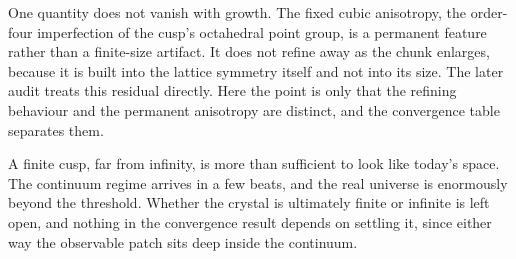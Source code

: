 One quantity does not vanish with growth. The fixed cubic anisotropy, the order-four imperfection of the cusp's
octahedral point group, is a permanent feature rather than a finite-size artifact. It does not refine away as the
chunk enlarges, because it is built into the lattice symmetry itself and not into its size. The later audit
treats this residual directly. Here the point is only that the refining behaviour and the permanent anisotropy
are distinct, and the convergence table separates them.


A finite cusp, far from infinity, is more than sufficient to look like today's space. The continuum regime
arrives in a few beats, and the real universe is enormously beyond the threshold. Whether the crystal is ultimately
finite or infinite is left open, and nothing in the convergence result depends on settling it, since either way
the observable patch sits deep inside the continuum.
